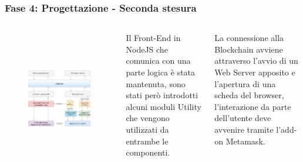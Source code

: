 \documentclass{beamer}
\begin{document}
\begin{frame}
	\frametitle{Fase 4: Progettazione - Seconda stesura}
	\begin{columns}
			\begin{figure}
				\includegraphics[width=1\textwidth, height=1.05\textwidth]{figures/architecture2.png}
			\end{figure}
		Il Front-End in NodeJS che comunica con una parte logica è stata mantenuta, sono stati però introdotti alcuni moduli Utility che vengono utilizzati da entrambe le componenti.

		La connessione alla Blockchain avviene attraverso l’avvio di un Web Server apposito e l’apertura di una scheda del browser, l’interazione da parte dell’utente deve avvenire tramite l’add-on Metamask.
	\end{columns}
\end{frame}
\end{document}
